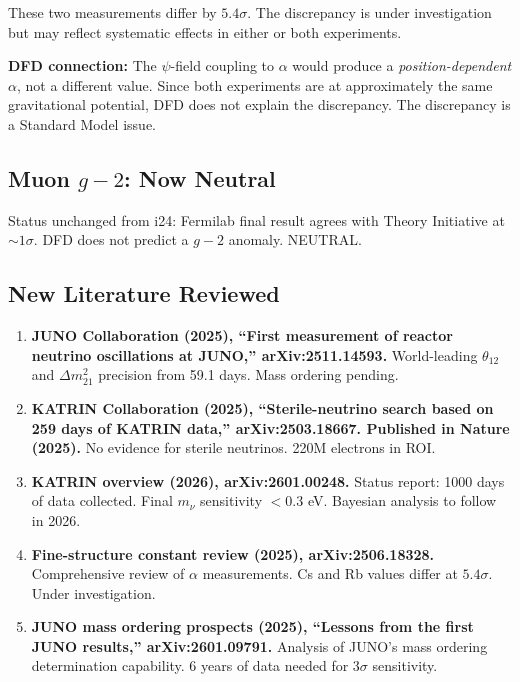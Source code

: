 \documentclass[11pt]{article}
\begin{document}
These two measurements differ by $5.4\sigma$. The discrepancy
is under investigation but may reflect systematic effects in either
or both experiments.

\textbf{DFD connection:} The $\psi$-field coupling to $\alpha$ would
produce a \emph{position-dependent} $\alpha$, not a different value.
Since both experiments are at approximately the same gravitational
potential, DFD does not explain the discrepancy. The discrepancy is
a Standard Model issue.

\subsection{Muon $g-2$: Now Neutral}

Status unchanged from i24: Fermilab final result agrees with
Theory Initiative at $\sim 1\sigma$. DFD does not predict a $g-2$
anomaly. NEUTRAL.

\subsection{New Literature Reviewed}

\begin{tcolorbox}[colback=green!5!white, colframe=green!50!black,
  title=\textbf{Agent 13: NEW LITERATURE REVIEWED}]

\begin{enumerate}

\item \textbf{JUNO Collaboration (2025), ``First measurement of
  reactor neutrino oscillations at JUNO,'' arXiv:2511.14593.}
  World-leading $\theta_{12}$ and $\Delta m^2_{21}$ precision from
  59.1 days. Mass ordering pending.

\item \textbf{KATRIN Collaboration (2025), ``Sterile-neutrino search
  based on 259 days of KATRIN data,'' arXiv:2503.18667. Published in
  Nature (2025).}
  No evidence for sterile neutrinos. 220M electrons in ROI.

\item \textbf{KATRIN overview (2026), arXiv:2601.00248.}
  Status report: 1000 days of data collected. Final $m_\nu$
  sensitivity $< 0.3$ eV. Bayesian analysis to follow in 2026.

\item \textbf{Fine-structure constant review (2025),
  arXiv:2506.18328.}
  Comprehensive review of $\alpha$ measurements. Cs and Rb
  values differ at $5.4\sigma$. Under investigation.

\item \textbf{JUNO mass ordering prospects (2025), ``Lessons from the
  first JUNO results,'' arXiv:2601.09791.}
  Analysis of JUNO's mass ordering determination capability. 6 years
  of data needed for $3\sigma$ sensitivity.

\end{enumerate}
\end{tcolorbox}
\end{document}
